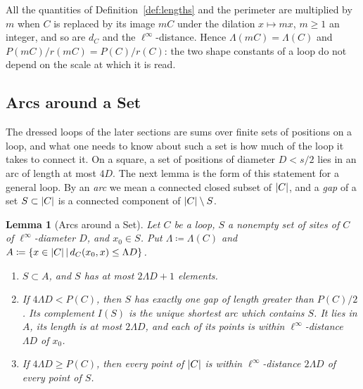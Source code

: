 \documentclass[11pt]{preprint}
\DeclarePairedDelimiter{\abs}{\lvert}{\rvert}
\numberwithin{equation}{section}
\newtheorem{lemma}[theorem]{Lemma}
\theoremstyle{definition}
\theoremstyle{remark}
\theoremstyle{plain}
\begin{document}
All the quantities of Definition~\ref{def:lengths} and the perimeter are multiplied by $m$ when $C$ is replaced by its image $mC$ under the dilation $x \mapsto mx$, $m \geq 1$ an integer, and so are $d_C$ and the $\ell^\infty$-distance. Hence $\Lambda(mC) = \Lambda(C)$ and $P(mC)/r(mC) = P(C)/r(C)$: the two shape constants of a loop do not depend on the scale at which it is read.

\subsection{Arcs around a Set}\label{sec:arcs}

The dressed loops of the later sections are sums over finite sets of positions on a loop, and what one needs to know about such a set is how much of the loop it takes to connect it. On a square, a set of positions of diameter $D < s/2$ lies in an arc of length at most $4D$. The next lemma is the form of this statement for a general loop. By an \emph{arc} we mean a connected closed subset of $\abs{C}$, and a \emph{gap} of a set $S \subset \abs{C}$ is a connected component of $\abs{C} \setminus S$.

\begin{lemma}[Arcs around a Set]\label{lem:arcs-around-set}
Let $C$ be a loop, $S$ a nonempty set of sites of $C$ of $\ell^\infty$-diameter $D$, and $x_0 \in S$. Put $\Lambda \coloneqq \Lambda(C)$ and $A \coloneqq \{ x \in \abs{C} \, | \, d_C(x_0, x) \leq \Lambda D \}$.
\begin{enumerate}[label=(\roman*)]
\item $S \subset A$, and $S$ has at most $2\Lambda D + 1$ elements.
\item If $4\Lambda D < P(C)$, then $S$ has exactly one gap of length greater than $P(C)/2$. Its complement $I(S)$ is the unique shortest arc which contains $S$. It lies in $A$, its length is at most $2\Lambda D$, and each of its points is within $\ell^\infty$-distance $\Lambda D$ of $x_0$.
\item If $4\Lambda D \geq P(C)$, then every point of $\abs{C}$ is within $\ell^\infty$-distance $2\Lambda D$ of every point of $S$.
\end{enumerate}
\end{lemma}
\end{document}
